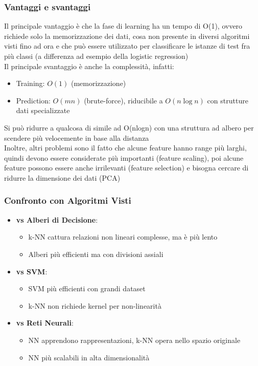 \documentclass[10pt,oneside,a4paper]{article}
\begin{document}
	\subsubsection{Vantaggi e svantaggi}
	Il principale vantaggio è che la fase di learning ha un tempo di O(1), ovvero richiede solo la memorizzazione dei dati, cosa non presente in diversi algoritmi visti fino ad ora e che può essere utilizzato per classificare le istanze di test fra più classi (a differenza ad esempio della logistic regression)\\
	Il principale svantaggio è anche la complessità, infatti:\\
	\begin{itemize}
		\item Training: $O(1)$ (memorizzazione)
		\item Prediction: $O(mn)$ (brute-force), riducibile a $O(n \log n)$ con strutture dati specializzate
	\end{itemize}
	Si può ridurre a qualcosa di simile ad O(nlogn) con una struttura ad albero per scendere più velocemente in base alla distanza\\
	Inoltre, altri problemi sono il fatto che alcune feature hanno range più larghi, quindi devono essere considerate più importanti (feature scaling), poi alcune feature possono essere anche irrilevanti (feature selection) e bisogna cercare di ridurre la dimensione dei dati (PCA)
	\subsubsection{Confronto con Algoritmi Visti}
	\begin{itemize}
		\item \textbf{vs Alberi di Decisione}: 
		\begin{itemize}
			\item k-NN cattura relazioni non lineari complesse, ma è più lento
			\item Alberi più efficienti ma con divisioni assiali
		\end{itemize}
		\item \textbf{vs SVM}: 
		\begin{itemize}
			\item SVM più efficienti con grandi dataset
			\item k-NN non richiede kernel per non-linearità
		\end{itemize}
		\item \textbf{vs Reti Neurali}:
		\begin{itemize}
			\item NN apprendono rappresentazioni, k-NN opera nello spazio originale
			\item NN più scalabili in alta dimensionalità
		\end{itemize}
	\end{itemize}
\end{document}
